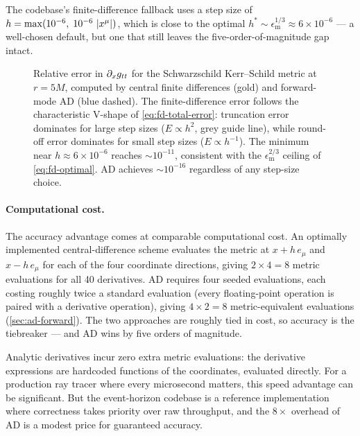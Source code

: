 The codebase's finite-difference fallback uses a step size
of $h = \max(10^{-6},\; 10^{-6}\,\left\lvert x^\mu \right\rvert)$, which is
close to the optimal $h^* \sim \epsilon_{\text{m}}^{1/3}
\approx 6 \times 10^{-6}$ --- a well-chosen default, but
one that still leaves the five-order-of-magnitude gap
intact.

\begin{figure}[t]
\centering

\caption[Accuracy of finite differences vs.\ automatic differentiation]{%
  Relative error in $\partial_{x} g_{tt}$ for the Schwarzschild
  Kerr--Schild metric at $r = 5M$, computed by central finite
  differences (gold) and forward-mode AD (blue dashed).  The
  finite-difference error follows the characteristic V-shape of
  \cref{eq:fd-total-error}: truncation error dominates for large
  step sizes ($E \propto h^2$, grey guide line), while round-off
  error dominates for small step sizes ($E \propto h^{-1}$).  The
  minimum near $h \approx 6 \times 10^{-6}$ reaches
  $\sim 10^{-11}$, consistent with the
  $\epsilon_{\text{m}}^{2/3}$ ceiling of \cref{eq:fd-optimal}.
  AD achieves $\sim 10^{-16}$ regardless of any step-size choice.}
\label{fig:ad-vs-fd-error}
\end{figure}

\paragraph{Computational cost.}

The accuracy advantage comes at comparable computational
cost.  An optimally implemented central-difference scheme
evaluates the metric at $x + h\,e_\mu$ and
$x - h\,e_\mu$ for each of the four coordinate directions,
giving $2 \times 4 = 8$ metric evaluations for all 40
derivatives.  AD requires four seeded evaluations, each
costing roughly twice a standard evaluation (every
floating-point operation is paired with a derivative
operation), giving $4 \times 2 = 8$ metric-equivalent
evaluations (\cref{sec:ad-forward}).  The two approaches
are roughly tied in cost, so accuracy is the
tiebreaker --- and AD wins by five orders of magnitude.

Analytic derivatives incur zero extra metric evaluations:
the derivative expressions are hardcoded functions of the
coordinates, evaluated directly.  For a production ray
tracer where every microsecond matters, this speed
advantage can be significant.  But the event-horizon
codebase is a reference implementation where correctness
takes priority over raw throughput, and the $8\times$
overhead of AD is a modest price for guaranteed accuracy.

